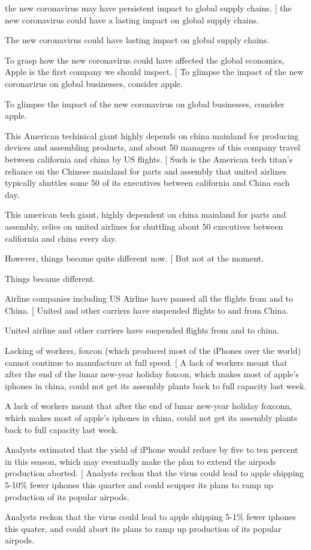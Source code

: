 \documentclass[a4paper,10pt]{article}
\begin{document}
the new coronavirus may have persistent impact to global supply chains.
[
	the new coronavirus could have a lasting impact on global supply chains.
	{
		The new coronavirus could have lasting impact on global supply chains.


To grasp how the new coronavirus could have affected the global economics, Apple is the first company we should inspect.
[
	To glimpse the impact of the new coronavirus on global businesses, consider apple.
	{
		To glimpse the impact of the new coronavirus on global businesses, consider apple.

This American techinical giant highly depends on china mainland for producing devices and assembling products, and about 50 managers of this company travel
between california and china by US flights.
[
	Such is the American tech titan's reliance on the Chinese mainland for parts and assembly that united airlines typically shuttles some 50 of its executives
	between california and China each day.
	{
		This american tech giant, highly dependent on china mainland for parts and assembly, relies on united airlines for shuttling
		about 50 executives between california and china every day.

However, things become quite different now.
[
	But not at the moment.
	{
		Things became different.

Airline companies including US Airline have paused all the flights from and to
China.
[
	United and other carriers have suspended flights to and from China.
	{
		United airline and other carriers have suspended flights from and to china.

Lacking of workers, foxcon (which produced most of the iPhones over the world)
cannot continue to manufacture at full speed.
[
	A lack of workers meant that after the end of the lunar new-year holiday
	foxcon, which makes most of apple's iphones in china, could not get
	its assembly plants back to full capacity last week.
	{
		A lack of workers meant that after the end of lunar new-year holiday
		foxconn, which makes most of apple's iphones in china, could not get
		its assembly plants back to full capacity last week.

Analysts estimated that the yield of iPhone would reduce by five to ten percent
in this season, which may eventually make the plan to extend the airpods production
aborted.
[
	Analysts reckon that the virus could lead to apple shipping 5-10\% fewer
	iphones this quarter and could scupper its plans to ramp up production of
	its popular airpods.
	{
		Analysts reckon that the virus could lead to apple shipping 5-1\% fewer
		iphones this quater, and could abort its plans to ramp up production
		of its popular airpods.

}}}}}}}
\end{document}
